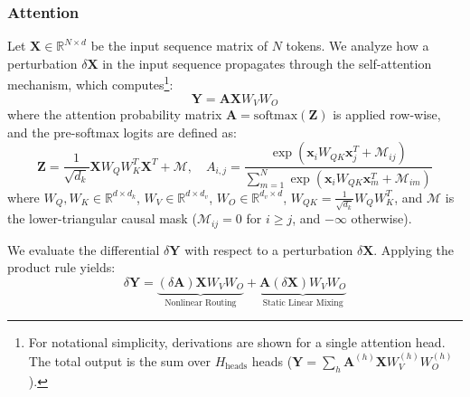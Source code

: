 \documentclass[a4paper,12pt]{article}
\begin{document}
    \subsubsection{Attention}


    Let $\mathbf{X} \in \mathbb{R}^{N \times d}$ be the input sequence matrix of $N$ tokens. We analyze how a perturbation $\delta \mathbf{X}$ in the input sequence propagates through the self-attention mechanism, which computes\footnote{For notational simplicity, derivations are shown for a single attention head. The total output is the sum over $H_{\text{heads}}$ heads ($\mathbf{Y} = \sum_h \mathbf{A}^{(h)} \mathbf{X} W_V^{(h)} W_O^{(h)}$).}:
    \begin{equation}
        \mathbf{Y} = \mathbf{A} \mathbf{X} W_V W_O
    \end{equation}
    where the attention probability matrix $\mathbf{A} = \text{softmax}(\mathbf{Z})$ is applied row-wise, and the pre-softmax logits are defined as:
    \begin{equation}
        \mathbf{Z} = \frac{1}{\sqrt{d_k}} \mathbf{X} W_Q W_K^T \mathbf{X}^T + \mathcal{M} , \quad A_{i,j} = \frac{\exp(\mathbf{x}_i W_{QK} \mathbf{x}_j^T + \mathcal{M}_{ij} )}{\sum_{m=1}^N \exp(\mathbf{x}_i W_{QK} \mathbf{x}_m^T + \mathcal{M}_{im})}
    \end{equation}
    where $W_Q, W_K \in \mathbb{R}^{d \times d_k}$, $W_V \in \mathbb{R}^{d \times d_v}$, $W_O \in \mathbb{R}^{d_v \times d}$, $W_{QK} = \frac{1}{\sqrt{d_k}} W_Q W_K^T$, and $\mathcal{M}$ is the lower-triangular causal mask ($\mathcal{M}_{ij} = 0$ for $i \ge j$, and $-\infty$ otherwise).


    We evaluate the differential $\delta \mathbf{Y}$ with respect to a perturbation $\delta \mathbf{X}$. Applying the product rule yields:
    \begin{equation}
        \delta \mathbf{Y} = \underbrace{(\delta \mathbf{A}) \mathbf{X} W_V W_O}_{\text{Nonlinear Routing}} + \underbrace{\mathbf{A} (\delta \mathbf{X}) W_V W_O}_{\text{Static Linear Mixing}}
    \end{equation}
\end{document}
